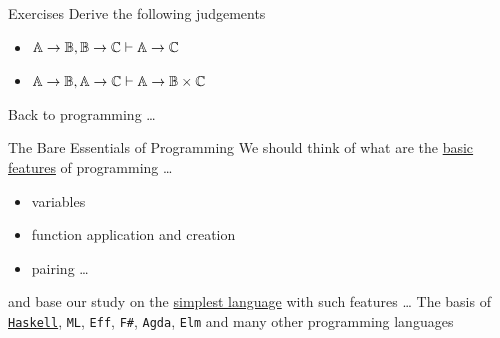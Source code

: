 \documentclass{beamer}
\begin{document}
\begin{frame}{Exercises}
  Derive the following judgements
  \begin{itemize}
          \item $\mathbb{A} \to \mathbb{B},\mathbb{B} \to \mathbb{C} \vdash \mathbb{A} \to \mathbb{C}$ 
          \item $\mathbb{A} \to \mathbb{B},\mathbb{A} \to \mathbb{C} \vdash \mathbb{A} \to \mathbb{B}
                  \times \mathbb{C}$
  \end{itemize}        
\end{frame}

\begin{frame}[plain]

        \begin{center}
                Back to programming \dots
        \end{center}
\end{frame}
\begin{slide}{The Bare Essentials of Programming}
  We should think of
  what are the \alert{\underline{basic features}} of programming \dots
  \begin{itemize}
  \item variables  
  \item function application and creation
  \item pairing \dots
  \end{itemize}
  and base our study on the \alert{\underline{simplest language}} with
  such features \dots
  \vfill
  The basis of \alert{\texttt{\underline{Haskell}}}, \texttt{ML},
  \texttt{Eff}, \texttt{F\#}, \texttt{Agda}, \texttt{Elm} and many
  other programming languages
\end{slide}
\end{document}
